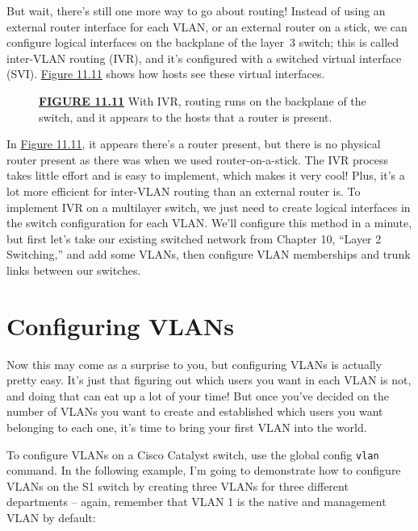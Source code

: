 But wait, there's still one more way to go about routing! Instead of
using an external router interface for each VLAN, or an external router
on a stick, we can configure logical interfaces on the backplane of the
layer~3 switch; this is called inter-VLAN routing (IVR), and it's
configured with a switched virtual interface (SVI).
\protect\hyperlink{c11.xhtmlux5cux23figure11-11}{Figure 11.11} shows how
hosts see these virtual interfaces.



\begin{figure}
\centering
\caption{{\protect\hyperlink{c11.xhtmlux5cux23figureanchor11-11}{\textbf{FIGURE
11.11}} With IVR, routing runs on the backplane of the switch, and it
appears to the hosts that a router is present.}}
\end{figure}

In \protect\hyperlink{c11.xhtmlux5cux23figure11-11}{Figure 11.11}, it
appears there's a router present, but there is no physical router
present as there was when we used router-on-a-stick. The IVR process
takes little effort and is easy to implement, which makes it very cool!
Plus, it's a lot more efficient for inter-VLAN routing than an external
router is. To implement IVR on a multilayer switch, we just need to
create logical interfaces in the switch configuration for each VLAN.
We'll configure this method in a minute, but first let's take our
existing switched network from Chapter 10, ``Layer 2 Switching,'' and
add some VLANs, then configure VLAN memberships and trunk links between
our switches.




\section{Configuring VLANs}

Now this may come as a surprise to you, but configuring VLANs is actually pretty easy.
It's just that figuring out which users you want
in each VLAN is not, and doing that can eat up a lot of your time! But
once you've decided on the number of VLANs you want to create and
established which users you want belonging to each one, it's time to
bring your first VLAN into the world.

To configure VLANs on a Cisco Catalyst switch, use the global config
\texttt{vlan} command. In the following example, I'm going to
demonstrate how to configure VLANs on the S1 switch by creating three
VLANs for three different departments -- again, remember that VLAN 1 is
the native and management VLAN by default:

